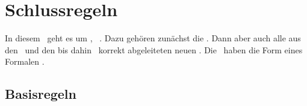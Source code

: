 \section{Schlussregeln}%
\label{sec:Schlussregeln}

In diesem \sectionname\ geht es um \zulaessigeTransformationen, \textdh\ \allgemeingueltigeSchlussregel.
Dazu gehören zunächst die \Basisregeln.
Dann aber auch alle aus den \Basisregeln\ und den bis dahin \allgemeingueltigenSchlussregeln\ korrekt abgeleiteten neuen \Schlussregeln.
Die \Schlussregeln\ haben die Form eines Formalen \Satzes.

\subsection{Basisregeln}%
\label{sub:Basisregeln}

